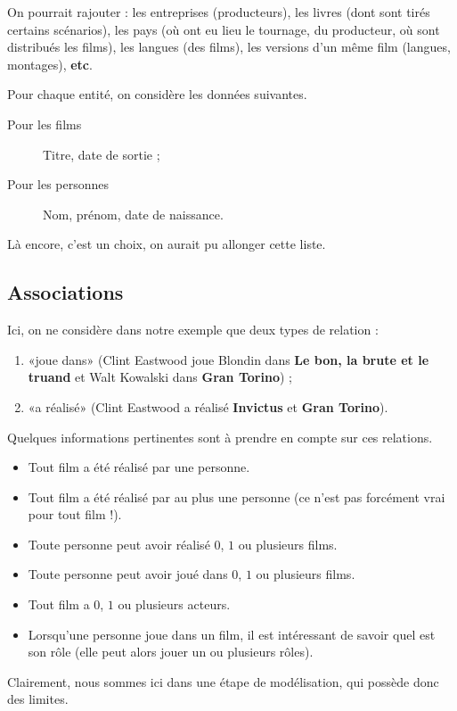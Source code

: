 \begin{rem}
  On pourrait rajouter : les entreprises (producteurs), les livres
  (dont sont tirés certains scénarios), les pays (où ont eu lieu le
  tournage, du producteur, où sont distribués les films), les langues
  (des films), les versions d'un même film (langues, montages), \textbf{etc}.
\end{rem}


Pour chaque entité, on considère les données suivantes. 
\begin{description}
\item[Pour les films] Titre, date de sortie ;
\item[Pour les personnes] Nom, prénom, date de naissance.
\end{description}
\begin{rem}
  Là encore, c'est un choix, on aurait pu allonger cette liste. 
\end{rem}

\subsection{Associations}
Ici, on ne considère dans notre exemple que deux types de relation :
  \begin{enumerate}
  \item «joue dans» (Clint Eastwood joue Blondin dans \textbf{Le bon, la brute
      et le truand} et Walt Kowalski dans \textbf{Gran Torino}) ;
  \item «a réalisé» (Clint Eastwood a réalisé \textbf{Invictus} et
    \textbf{Gran Torino}).
  \end{enumerate}


Quelques informations pertinentes sont à prendre en compte sur ces relations.
\begin{itemize}
\item Tout film a été réalisé par une personne.
\item Tout film a été réalisé par au plus une personne (ce n'est pas forcément vrai pour tout film !).
\item Toute personne peut avoir réalisé $0$, $1$ ou plusieurs films.
\item Toute personne peut avoir joué dans $0$, $1$ ou plusieurs films.
\item Tout film a $0$, $1$ ou plusieurs acteurs.
\item Lorsqu'une personne joue dans un film, il est intéressant de
  savoir quel est son rôle (elle peut alors jouer un ou plusieurs rôles).
\end{itemize}
Clairement, nous sommes ici dans une étape de modélisation, qui possède donc des limites.

